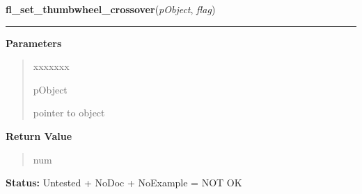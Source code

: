 \hspace{.8\funcindent}\begin{boxedminipage}{\funcwidth}

    \raggedright \textbf{fl\_set\_thumbwheel\_crossover}(\textit{pObject}, \textit{flag})

    \vspace{-1.5ex}

    \rule{\textwidth}{0.5\fboxrule}
\setlength{\parskip}{2ex}
\setlength{\parskip}{1ex}
      \textbf{Parameters}
      \vspace{-1ex}

      \begin{quote}
        \begin{Ventry}{xxxxxxx}

          \item[pObject]

          pointer to object

        \end{Ventry}

      \end{quote}

      \textbf{Return Value}
    \vspace{-1ex}

      \begin{quote}
      num

      \end{quote}

\textbf{Status:} Untested + NoDoc + NoExample = NOT OK



    \end{boxedminipage}

    \label{xformslib:library:fl_set_thumbwheel_bounds}

    \vspace{0.5ex}


